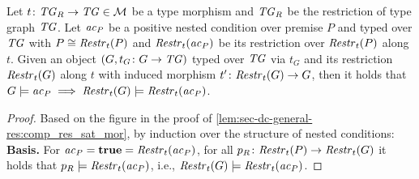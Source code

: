 \begin{lemma}
\label{lem:sec-dc-general-res:comp_res_sat_I}
Let $t\colon \mathit{TG}_R \to \mathit{TG} \in {\cal M}$ be a type morphism and $\mathit{TG}_R$ be the restriction of type graph $\mathit{TG}$.
Let $\mathit{ac}_P$ be a positive nested condition over premise $P$ and typed over $\mathit{TG}$ with $P \cong \mathit{Restr}_t(P)$ and $\mathit{Restr}_t(\mathit{ac}_P)$ be its restriction over $\mathit{Restr}_t(P)$ along $t$.
Given an object $(G,t_G\colon G \to \mathit{TG})$ typed over $\mathit{TG}$ via $t_G$ and its restriction $\mathit{Restr}_t(G)$ along $t$ with induced morphism $t'\colon \mathit{Restr}_t(G) \to G$, then it holds that $G \models \mathit{ac}_P \implies \mathit{Restr}_t(G) \models \mathit{Restr}_t(\mathit{ac}_P)$.
\envEndMarker
\end{lemma}

\begin{proof}
Based on the figure in the proof of \cref{lem:sec-dc-general-res:comp_res_sat_mor}, by induction over the structure of nested conditions:
\textbf{Basis.}
For $\mathit{ac}_P=\textbf{true}=\mathit{Restr}_t(\mathit{ac}_P)$, for all $p_R\colon \mathit{Restr}_t(P) \to \mathit{Restr}_t(G)$ it holds that $p_R \models \mathit{Restr}_t(\mathit{ac}_P)$, i.e., $\mathit{Restr}_t(G) \models \mathit{Restr}_t(\mathit{ac}_P)$.


\end{proof}
